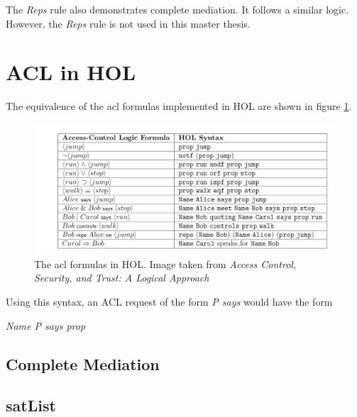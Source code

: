 \documentclass[../../main/main.tex]{subfiles}
\begin{document}
The \textit{Reps} rule also demonstrates complete mediation.  It follows a similar logic.  However, the \textit{Reps} rule is not used in this master thesis.

\section{ACL in HOL} \label{sec:aclinhol}
The equivalence of the \gls{acl} formulas implemented in HOL are shown in figure \ref{aclformulasHOL}.

\begin{figure}[h]
\centering
\includegraphics[width=\textwidth]{../figures/aclformulasHOL}
\caption{\label{aclformulasHOL}The \gls{acl} formulas in HOL.  Image taken from \textit{Access Control, Security, and Trust: A Logical Approach}\cite{ChinOlder}}
\end{figure}

Using this syntax, an ACL request of the form \textit{P says \textphi} would have the form
\centerline{ \textit{Name P says prop \textphi}}


\subsection{Complete Mediation}
\subsection{satList}
\end{document}
